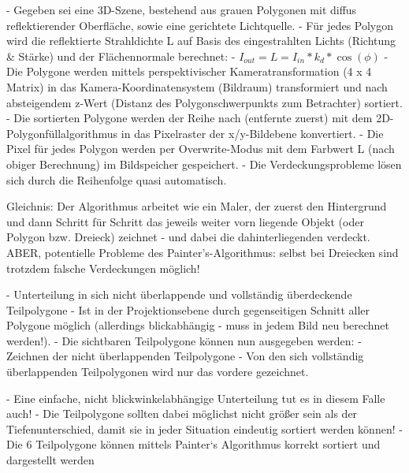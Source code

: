 \documentclass[10pt,landscape]{article}
\begin{document}
\begin{multicols}{3}
  - Gegeben sei eine 3D-Szene, bestehend aus grauen Polygonen mit diffus reflektierender Oberfläche, sowie eine gerichtete Lichtquelle.
  - Für jedes Polygon wird die reflektierte Strahldichte L auf Basis des eingestrahlten Lichts (Richtung \& Stärke) und der Flächennormale berechnet:
  - $I_{out} = L = I_{in}* k_d * \cos(\phi)$
  - Die Polygone werden mittels perspektivischer Kameratransformation (4 x 4 Matrix) in das Kamera-Koordinatensystem (Bildraum) transformiert und nach absteigendem z-Wert (Distanz des Polygonschwerpunkts zum Betrachter) sortiert.
  - Die sortierten Polygone werden der Reihe nach (entfernte zuerst) mit dem 2D-Polygonfüllalgorithmus in das Pixelraster der x/y-Bildebene konvertiert.
  - Die Pixel für jedes Polygon werden per Overwrite-Modus mit dem Farbwert L (nach obiger Berechnung) im Bildspeicher gespeichert.
  - Die Verdeckungsprobleme lösen sich durch die Reihenfolge quasi automatisch.
  
  Gleichnis: Der Algorithmus arbeitet wie ein Maler, der zuerst den Hintergrund und dann Schritt für Schritt das jeweils weiter vorn liegende Objekt (oder Polygon bzw. Dreieck) zeichnet - und dabei die dahinterliegenden verdeckt. ABER, potentielle Probleme des Painter’s-Algorithmus: selbst bei Dreiecken sind trotzdem falsche Verdeckungen möglich!
  
  - Unterteilung in sich nicht überlappende und vollständig überdeckende Teilpolygone
  - Ist in der Projektionsebene durch gegenseitigen Schnitt aller Polygone möglich (allerdings blickabhängig - muss in jedem Bild neu berechnet werden!).
  - Die sichtbaren Teilpolygone können nun ausgegeben werden:
  - Zeichnen der nicht überlappenden Teilpolygone
  - Von den sich vollständig überlappenden Teilpolygonen wird nur das vordere gezeichnet.
  
  
  - Eine einfache, nicht blickwinkelabhängige Unterteilung tut es in diesem Falle auch!
  - Die Teilpolygone sollten dabei möglichst nicht größer sein als der Tiefenunterschied, damit sie in jeder Situation eindeutig sortiert werden können!
  - Die 6 Teilpolygone können mittels Painter‘s Algorithmus korrekt sortiert und dargestellt werden
  

\end{multicols}
\end{document}
